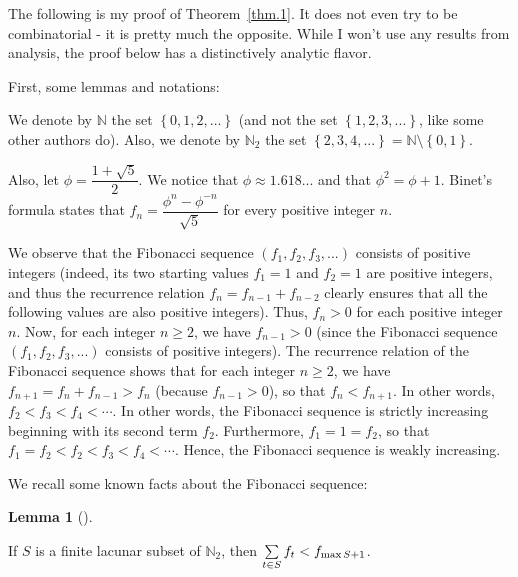 \documentclass[numbers=enddot,12pt,final,onecolumn,notitlepage]{scrartcl}%
\numberwithin{exer}{section}
\theoremstyle{definition}
\newtheorem{lem}[theo]{Lemma}
\newenvironment{lemma}[1][]
{\begin{lem}[#1]\begin{leftbar}}
{\end{leftbar}\end{lem}}
\let\sumnonlimits\sum
\renewcommand{\sum}{\sumnonlimits\limits}
\begin{document}
The following is my proof of Theorem~\ref{thm.1}. It does not even try to be
combinatorial - it is pretty much the opposite. While I won't use any results
from analysis, the proof below has a distinctively analytic flavor.

First, some lemmas and notations:

We denote by $\mathbb{N}$ the set $\left\{  0,1,2,...\right\}  $ (and not the
set $\left\{  1,2,3,...\right\}  $, like some other authors do). Also, we
denote by $\mathbb{N}_{2}$ the set $\left\{  2,3,4,...\right\}  =\mathbb{N}%
\setminus\left\{  0,1\right\}  $.

Also, let $\phi=\dfrac{1+\sqrt{5}}{2}$. We notice that $\phi\approx1.618...$
and that $\phi^{2}=\phi+1$.
Binet's formula states that $f_{n}=\dfrac{\phi^{n}-\phi^{-n}}{\sqrt{5}}$ for
every positive integer $n$.

We observe that the Fibonacci sequence $\left(  f_{1},f_{2},f_{3},...\right)
$ consists of positive integers (indeed, its two starting values $f_{1}=1$ and
$f_{2}=1$ are positive integers, and thus the recurrence relation
$f_{n}=f_{n-1}+f_{n-2}$ clearly ensures that all the following values are also
positive integers). Thus, $f_{n} > 0$ for each positive integer $n$. Now, for
each integer $n \geq2$, we have $f_{n-1} > 0$ (since the Fibonacci sequence
$\left(  f_{1},f_{2},f_{3},...\right)  $ consists of positive integers). The
recurrence relation of the Fibonacci sequence shows that for each integer $n
\geq2$, we have $f_{n+1} = f_{n} + f_{n-1} > f_{n}$ (because $f_{n-1} > 0$),
so that $f_{n} < f_{n+1}$. In other words, $f_{2} < f_{3} < f_{4} < \cdots$.
In other words, the Fibonacci sequence is strictly increasing beginning with
its second term $f_{2}$. Furthermore, $f_{1} = 1 = f_{2}$, so that $f_{1} =
f_{2} < f_{2} < f_{3} < f_{4} < \cdots$. Hence, the Fibonacci sequence is
weakly increasing.

We recall some known facts about the Fibonacci sequence:

\begin{lemma} \label{lem.2}
If $S$ is a finite lacunar subset of $\mathbb{N}_{2}$, then
$\sum\limits_{t\in S}f_{t}<f_{\max S+1}$.
\end{lemma}
\end{document}
